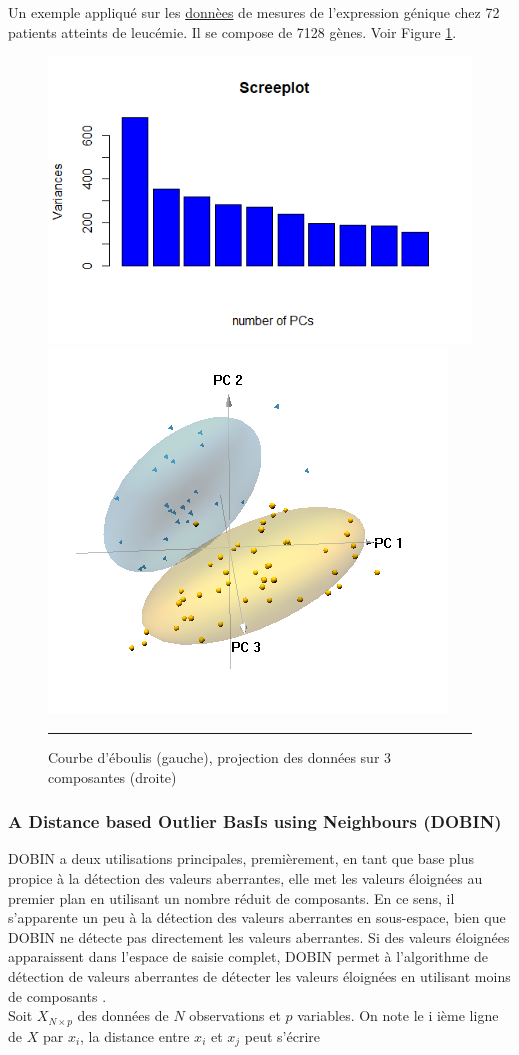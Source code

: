 \begin{example}
Un exemple appliqué sur  les \href{1http://web.stanford.edu/ hastie/CASIles/DATA/leukemia big.csv}{donnèes} de mesures de l'expression génique chez 72 patients atteints de leucémie. Il se compose de 7128 gènes. Voir Figure \ref{fig0}.
\begin{figure}[t]
    \centering
     \includegraphics[width=.5\textwidth]{ADOA/Images/screeleuk.png}
    \includegraphics[width=.4\textwidth]{ADOA/Images/3dpcleuk.PNG}
    \caption{Courbe d'éboulis (gauche), projection des données sur 3 composantes (droite)}\hrule
    \label{fig0}
\end{figure}
\end{example}

\subsubsection*{A Distance based Outlier BasIs using Neighbours (DOBIN)}
 DOBIN a deux utilisations principales,  premièrement, en tant que base plus propice à la détection des valeurs aberrantes, elle met les valeurs éloignées au premier plan en utilisant un nombre réduit de composants. En ce sens, il s’apparente un peu à la détection des valeurs aberrantes en sous-espace, bien que DOBIN ne détecte pas directement les valeurs aberrantes. Si des valeurs éloignées apparaissent dans l’espace de saisie complet, DOBIN permet à l'algorithme de détection de valeurs aberrantes de détecter les valeurs éloignées en utilisant moins de composants \cite{A7}.  \\
 Soit  $X_{N\times p}$ des données de  $N$ observations et $p$ variables.
 On note le i ième ligne de $X$ par $x_i$, la distance entre  $x_i$ et $x_j$ peut s'écrire
 
